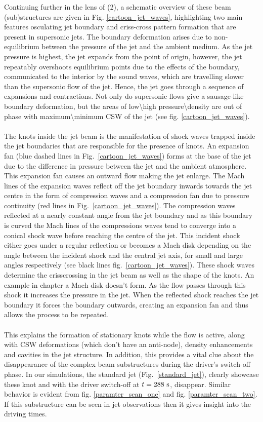 \documentclass[12pt]{ociamthesis}
\newcommand{\fref}[1]{fig. \ref{#1}}
\newcommand{\np}{\\ \\}
\begin{document}
Continuing further in the lens of (2), a schematic overview of these beam (sub)structures are given in Fig. \ref{cartoon_jet_waves}, highlighting two main features osculating jet boundary and criss-cross pattern formation that are present in supersonic jets. The boundary deformation arises due to non-equilibrium between the pressure of the jet and the ambient medium. As the jet pressure is highest, the jet expands from the point of origin, however, the jet repeatably overshoots equilibrium points due to the effects of the boundary, communicated to the interior by the sound waves, which are travelling slower than the supersonic flow of the jet. Hence, the jet goes through a sequence of expansions and contractions. Not only do supersonic flows give a sausage-like boundary deformation, but the areas of low\textbackslash high pressure\textbackslash density are out of phase with maximum\textbackslash minimum CSW of the jet (see fig. \ref{cartoon_jet_waves}). \np 
%
The knots inside the jet beam is the manifestation of shock waves trapped inside the jet boundaries that are responsible for the presence of knots. An expansion fan (blue dashed lines in Fig.~\ref{cartoon_jet_waves}) forms at the base of the jet due to the difference in pressure between the jet and the ambient atmosphere. This expansion fan causes an outward flow making the jet enlarge. The Mach lines of the expansion waves reflect off the jet boundary inwards towards the jet centre in the form of compression waves and a compression fan due to pressure continuity (red lines in Fig.~\ref{cartoon_jet_waves}). The compression waves reflected at a nearly constant angle from the jet boundary and as this boundary is curved the Mach lines of the compressions waves tend to converge into a conical shock wave before reaching the centre of the jet. This incident shock either goes under a regular reflection or becomes a Mach disk depending on the angle between the incident shock and the central jet axis, for small and large angles respectively (see black lines fig.~\ref{cartoon_jet_waves}). These shock waves determine the crisscrossing in the jet beam as well as the shape of the knots. An example in chapter a Mach disk doesn't form. As the flow passes through this shock it increases the pressure in the jet. When the reflected shock reaches the jet boundary it forces the boundary outwards, creating an expansion fan and thus allows the process to be repeated. \np
%
This explains the formation of stationary knots while the flow is active, along with CSW deformations (which don't have an anti-node), density enhancements and cavities in the jet structure. In addition, this provides a vital clue about the disappearance of the complex beam substructures during the driver’s switch-off phase. In our simulations, the standard jet (Fig.~\ref{standard_jet}), clearly showcase these knot and with the driver switch-off at $t=288~\rm{s}$, disappear. Similar behavior is evident from \fref{paramter_scan_one} and \fref{paramter_scan_two}. If this substructure can be seen in jet observations then it gives insight into the driving times.
\end{document}
